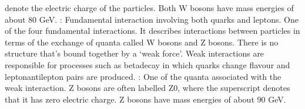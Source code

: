 \documentclass[letterpaper,10pt,english]{sphinxmanual}
\begin{document}
denote the electric charge of the particles. Both W bosons have mass energies of about 80 GeV. : Fundamental interaction involving both quarks and leptons. One of the four fundamental interactions. It describes interactions between particles in terms of the exchange of quanta called W bosons and Z bosons. There is no structure that’s bound together by a ‘weak force’. Weak interactions are responsible for processes such as beta\sphinxhyphen{}decay in which quarks change flavour and
lepton\textendash{}antilepton pairs are produced. : One of the quanta associated with the weak interaction. Z bosons are often labelled Z0, where the superscript denotes that it has zero electric charge. Z bosons have mass energies of about 90 GeV.



\renewcommand{\indexname}{Index}
\printindex
\end{document}
